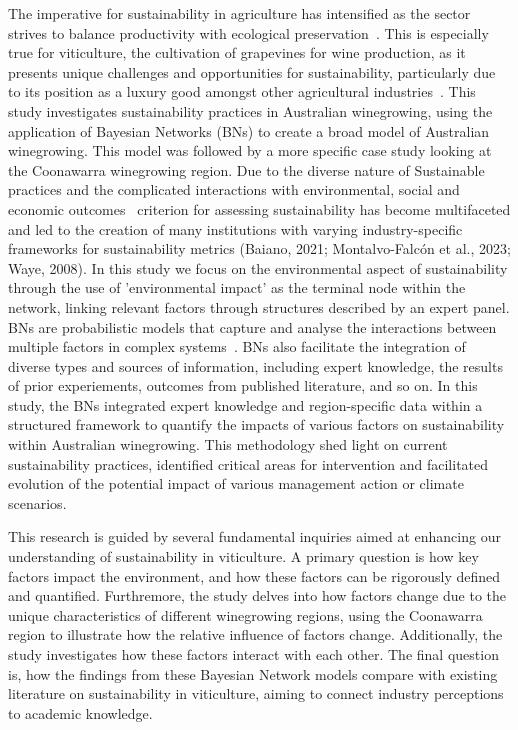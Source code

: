 The imperative for sustainability in agriculture has intensified as the sector strives to balance productivity with ecological preservation~\cite{baianoOverviewSustainabilityWine2021,corboEnvironmentalSustainabilityPrograms2014}. This is especially true for viticulture, the cultivation of grapevines for wine production, as it presents unique challenges and opportunities for sustainability, particularly due to its position as a luxury good amongst other agricultural industries~\cite{longbottomExploringLinksSustainability2018,ferraraLifeCycleAssessment2018}. This study investigates sustainability practices in Australian winegrowing, using the application of Bayesian Networks (BNs) to create a broad model of Australian winegrowing. This model was followed by a more specific case study looking at the Coonawarra winegrowing region. Due to the diverse nature of Sustainable practices and the complicated interactions with environmental, social and economic outcomes~\citep{beaumelle_biodiversity_2023} criterion for assessing sustainability has become multifaceted and led to the creation of many institutions with varying industry-specific frameworks for sustainability metrics (Baiano, 2021; Montalvo-Falcón et al., 2023; Waye, 2008). In this study we focus on the environmental aspect of sustainability through the use of 'environmental impact' as the terminal node within the network, linking relevant factors through structures described by an expert panel.
BNs are probabilistic models that capture and analyse the interactions between multiple factors in complex systems~\cite{korbBayesianArtificialIntelligence2011}. BNs also facilitate the integration of diverse types and sources of information, including expert knowledge, the results of prior experiements, outcomes from published literature, and so on. In this study, the BNs integrated expert knowledge and region-specific data within a structured framework to quantify the impacts of various factors on sustainability within Australian winegrowing. This methodology shed light on current sustainability practices, identified critical areas for intervention and facilitated evolution of the potential impact of various management action or climate scenarios.

This research is guided by several fundamental inquiries aimed at enhancing our understanding of sustainability in viticulture. A primary question is how key factors impact the environment, and how these factors can be rigorously defined and quantified. Furthremore, the study delves into how factors change due to the unique characteristics of different winegrowing regions, using the Coonawarra region to illustrate how the relative influence of factors change. Additionally, the study investigates how these factors interact with each other. The final question is, how the findings from these Bayesian Network models compare with existing literature on sustainability in viticulture, aiming to connect industry perceptions to academic knowledge.

